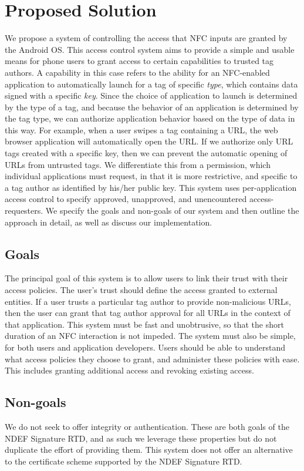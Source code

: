\documentclass[12pt]{article}
\begin{document}
\section{Proposed Solution}
We propose a system of controlling the access that NFC inputs are granted by the Android OS.
This access control system aims to provide a simple and usable means for phone users to grant access to certain capabilities to trusted tag authors.
A capability in this case refers to the ability for an NFC-enabled application to automatically launch for a tag of specific \textit{type}, which contains data signed with a specific \textit{key}.
Since the choice of application to launch is determined by the type of a tag, and because the behavior of an application is determined by the tag type, we can authorize application behavior based on the type of data in this way.
For example, when a user swipes a tag containing a URL, the web browser application will automatically open the URL.
If we authorize only URL tags created with a specific key, then we can prevent the automatic opening of URLs from untrusted tags.
We differentiate this from a permission, which individual applications must request, in that it is more restrictive, and specific to a tag author as identified by his/her public key.
This system uses per-application access control to specify approved, unapproved, and unencountered access-requesters.
We specify the goals and non-goals of our system and then outline the approach in detail, as well as discuss our implementation.

\subsection{Goals}
The principal goal of this system is to allow users to link their trust with their access policies.
The user's trust should define the access granted to external entities.
If a user trusts a particular tag author to provide non-malicious URLs, then the user can grant that tag author approval for all URLs in the context of that application.
This system must be fast and unobtrusive, so that the short duration of an NFC interaction is not impeded.
The system must also be simple, for both users and application developers.
Users should be able to understand what access policies they choose to grant, and administer these policies with ease.
This includes granting additional access and revoking existing access.

\subsection{Non-goals}
We do not seek to offer integrity or authentication.
These are both goals of the NDEF Signature RTD, and as such we leverage these properties but do not duplicate the effort of providing them.
This system does not offer an alternative to the certificate scheme supported by the NDEF Signature RTD.
\end{document}
